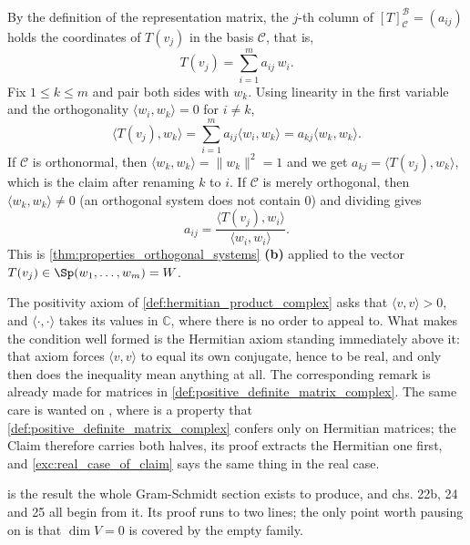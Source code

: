 \begin{exercisesolution}
\label{sol:matrix_representation_orthonormal}
  By the definition of the representation matrix, the $j$-th column of $[T]_{\mathcal{C}}^{\mathcal{B}} = (a_{ij})$ holds the coordinates of $T(v_j)$ in the basis $\mathcal{C}$, that is,
  \[ T(v_j) = \sum_{i=1}^m a_{ij} \, w_i . \]
  Fix $1 \le k \le m$ and pair both sides with $w_k$. Using linearity in the first variable and the orthogonality $\langle w_i, w_k \rangle = 0$ for $i \ne k$,
  \[ \langle T(v_j), w_k \rangle = \sum_{i=1}^m a_{ij} \langle w_i, w_k \rangle = a_{kj} \langle w_k, w_k \rangle . \]
  If $\mathcal{C}$ is orthonormal, then $\langle w_k, w_k \rangle = \|w_k\|^2 = 1$ and we get $a_{kj} = \langle T(v_j), w_k \rangle$, which is the claim after renaming $k$ to $i$. If $\mathcal{C}$ is merely orthogonal, then $\langle w_k, w_k \rangle \ne 0$ (an orthogonal system does not contain $0$) and dividing gives
  \[ a_{ij} = \frac{\langle T(v_j), w_i \rangle}{\langle w_i, w_i \rangle} . \]
  This is \cref{thm:properties_orthogonal_systems} \textbf{(b)} applied to the vector $T(v_j) \in \Sp(w_1, \dots, w_m) = W$.
\end{exercisesolution}



\begin{ainote}
The positivity axiom of \cref{def:hermitian_product_complex} asks that
$\langle v, v \rangle > 0$, and $\langle \cdot, \cdot \rangle$ takes its values
in $\mathbb{C}$, where there is no order to appeal to. What makes the condition
well formed is the Hermitian axiom standing immediately above it: that axiom
forces $\langle v, v \rangle$ to equal its own conjugate, hence to be real, and
only then does the inequality mean anything at all. The corresponding remark is
already made for matrices in \cref{def:positive_definite_matrix_complex}. The
same care is wanted on , where
 is a property that
\cref{def:positive_definite_matrix_complex} confers only on Hermitian matrices;
the Claim therefore carries both halves, its proof extracts the Hermitian one
first, and \cref{exc:real_case_of_claim} says the same thing in the real case.

 is the result the whole Gram-Schmidt section
exists to produce, and chs. 22b, 24 and 25 all begin from it. Its proof runs to
two lines; the only point worth pausing on is that $\dim V = 0$ is covered by
the empty family.
\end{ainote}


